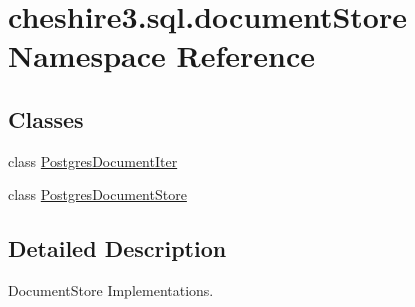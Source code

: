 \hypertarget{namespacecheshire3_1_1sql_1_1document_store}{\section{cheshire3.\-sql.\-document\-Store Namespace Reference}
\label{namespacecheshire3_1_1sql_1_1document_store}
}
\subsection*{Classes}
\begin{DoxyCompactItemize}
\item 
class \hyperlink{classcheshire3_1_1sql_1_1document_store_1_1_postgres_document_iter}{Postgres\-Document\-Iter}
\item 
class \hyperlink{classcheshire3_1_1sql_1_1document_store_1_1_postgres_document_store}{Postgres\-Document\-Store}
\end{DoxyCompactItemize}


\subsection{Detailed Description}
\begin{DoxyVerb}DocumentStore Implementations.\end{DoxyVerb}
 